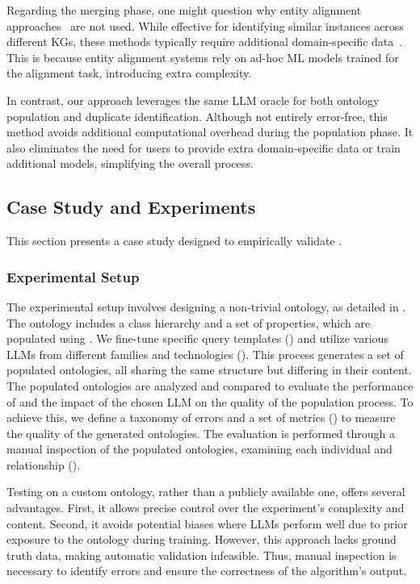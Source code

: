 %
Regarding the merging phase, one might question why entity alignment approaches~\cite{ZhaoTkde2022} are not used.
%
While effective for identifying similar instances across different \glspl{KG}, these methods typically require additional domain-specific data~\cite{ChenIjcai2018,XuAcl2019}.
%
This is because entity alignment systems rely on ad-hoc \gls{ML} models trained for the alignment task, introducing extra complexity.

%
In contrast, our approach leverages the same \gls{LLM} oracle for both ontology population and duplicate identification.
%
Although not entirely error-free, this method avoids additional computational overhead during the population phase.
%
It also eliminates the need for users to provide extra domain-specific data or train additional models, simplifying the overall process.
%



\subsection{Case Study and Experiments}
\label{subsec:case-study}
%
This section presents a case study designed to empirically validate \llmfkg{}.

%
\subsubsection{Experimental Setup}
\label{subsubsec:experimental-setup}
%
The experimental setup involves designing a non-trivial ontology, as detailed in .
%
The ontology includes a class hierarchy and a set of properties, which are populated using \llmfkg{}.
%
We fine-tune specific query templates () and utilize various \glspl{LLM} from different families and technologies ().
%
This process generates a set of populated ontologies, all sharing the same structure but differing in their content.
%
The populated ontologies are analyzed and compared to evaluate the performance of \llmfkg{} and the impact of the chosen \gls{LLM} on the quality of the population process.
%
To achieve this, we define a taxonomy of errors and a set of metrics () to measure the quality of the generated ontologies.
%
The evaluation is performed through a manual inspection of the populated ontologies, examining each individual and relationship ().

%
Testing \llmfkg{} on a custom ontology, rather than a publicly available one, offers several advantages.
%
First, it allows precise control over the experiment's complexity and content.
%
Second, it avoids potential biases where \glspl{LLM} perform well due to prior exposure to the ontology during training.
%
However, this approach lacks ground truth data, making automatic validation infeasible.
%
Thus, manual inspection is necessary to identify errors and ensure the correctness of the algorithm's output.

